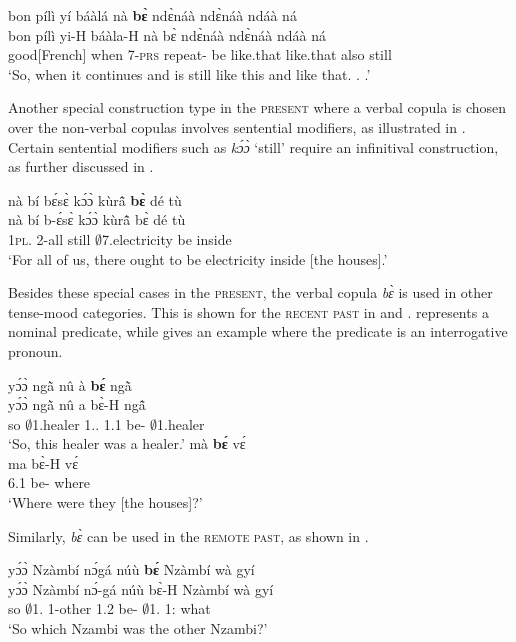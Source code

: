 \ea \label{becoord}
  \glll  bon pílì yí báàlá nà {\bfseries bɛ̀} ndɛ̀náà ndɛ̀náà ndáà ná\\
        bon pílì yi-H báàla-H nà bɛ̀ ndɛ̀náà ndɛ̀náà ndáà ná \\
          good[French] when 7-\textsc{prs} repeat-{\R} {\COM} be like.that like.that also still\\
    \trans `So, when it continues and is still like this and like that. . .'
\z

Another special construction type in the \textsc{present} where a verbal copula is chosen over the non-verbal copulas involves sentential modifiers, as illustrated in . Certain sentential modifiers such as {\itshape kɔ́ɔ̀} `still' require an infinitival construction, as further discussed in .

\ea \label{koobe}
  \glll nà bí bɛ́sɛ̀ kɔ́ɔ̀ kùrã̂ {\bfseries bɛ̀} dé tù \\
       nà bí b-ɛ́sɛ̀ kɔ́ɔ̀ kùrã̂ bɛ̀ dé tù \\
        {\COM} 1\textsc{pl}.{\SBJ} 2-all still $\emptyset$7.electricity  be {\LOC} inside\\
    \trans `For all of us, there ought to be electricity inside [the houses].'
\z

Besides these special cases in the \textsc{present}, the verbal copula {\itshape bɛ̀} is used in other tense-mood categories. This is shown for the \textsc{recent past} in  and .  represents a nominal predicate, while  gives an example where the predicate is an interrogative pronoun.


\ea \label{bepst1a}
  \glll   yɔ́ɔ̀ ngã̀ nû à {\bfseries bɛ́} ngã̀  \\
          yɔ́ɔ̀ ngã̀ nû a bɛ̀-H ngã̂ \\
         so $\emptyset$1.healer 1.{\DEM}.{\PROX} 1.{\PST}1 be-{\R} $\emptyset$1.healer\\
    \trans `So, this healer was a healer.'
\ex\label{bepst1b}
  \glll     mà {\bfseries bɛ́} vɛ́ \\ 
            ma bɛ̀-H vɛ́ \\
              6.{\PST}1 be-{\R} where\\
    \trans `Where were they [the houses]?'
\z


\noindent Similarly, {\itshape bɛ̀} can be used in the \textsc{remote past}, as shown in .

\ea \label{bepst2}
  \glll  yɔ́ɔ̀ Nzàmbí nɔ́gá núù {\bfseries bɛ́} Nzàmbí wà gyí\\
        yɔ́ɔ̀ Nzàmbí nɔ́-gá núù bɛ̀-H Nzàmbí wà gyí \\
          so $\emptyset$1.{\PN} 1-other 1.{\PST}2 be-{\R}  $\emptyset$1.{\PN} 1:{\ATT} what\\
    \trans `So which Nzambi was the other Nzambi?'
\z

